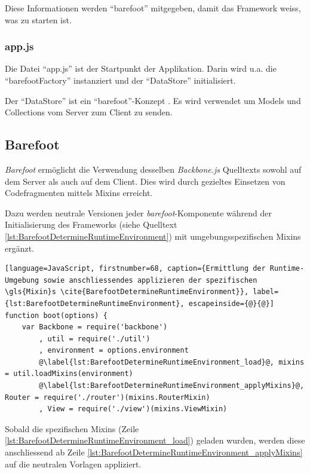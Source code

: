 Diese Informationen werden ``barefoot'' \cite{Barefoot} mitgegeben, damit das Framework weiss, was zu starten ist.

\subsubsection*{app.js}
Die Datei ``app.js'' \cite{appjs} ist der Startpunkt der Applikation.
Darin wird u.a. die ``barefootFactory'' instanziert und der ``DataStore'' initialisiert.

Der ``DataStore'' ist ein ``barefoot''-Konzept \cite{barefootDatastore}. Es wird verwendet um Models und Collections vom Server zum Client zu senden.

\subsection{Barefoot}

\emph{Barefoot} \cite{Barefoot} ermöglicht die Verwendung desselben \emph{Backbone.js} Quelltexts sowohl auf dem Server als auch auf dem Client. Dies wird durch gezieltes Einsetzen von Codefragmenten mittels \gls{Mixin}s erreicht.

Dazu werden neutrale Versionen jeder \emph{barefoot}-Komponente während der Initialisierung des Frameworks (siehe Quelltext \ref{lst:BarefootDetermineRuntimeEnvironment}) mit umgebungsspezifischen Mixins ergänzt.

\begin{lstlisting}[language=JavaScript, firstnumber=68, caption={Ermittlung der Runtime-Umgebung sowie anschliessendes applizieren der spezifischen \gls{Mixin}s \cite{BarefootDetermineRuntimeEnvironment}}, label={lst:BarefootDetermineRuntimeEnvironment}, escapeinside={@}{@}]
function boot(options) {
	var Backbone = require('backbone')
		, util = require('./util')
		, environment = options.environment
		@\label{lst:BarefootDetermineRuntimeEnvironment_load}@, mixins = util.loadMixins(environment)
		@\label{lst:BarefootDetermineRuntimeEnvironment_applyMixins}@, Router = require('./router')(mixins.RouterMixin)
		, View = require('./view')(mixins.ViewMixin)
\end{lstlisting}

Sobald die spezifischen \gls{Mixin}s (Zeile \ref{lst:BarefootDetermineRuntimeEnvironment_load}) geladen wurden, werden diese anschliessend ab Zeile \ref{lst:BarefootDetermineRuntimeEnvironment_applyMixins} auf die neutralen Vorlagen appliziert.
